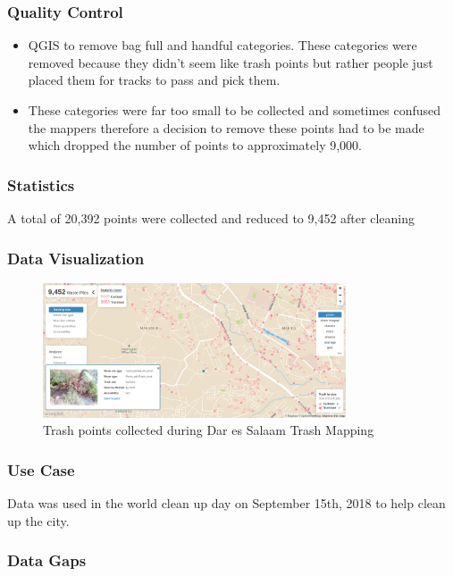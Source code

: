 \documentclass[a4paper,12pt,twoside]{article}
\begin{document}
\subsubsection{Quality Control}
\begin{itemize}
    \item QGIS to remove bag full and handful categories.
    These categories were removed because they didn't seem like trash points but rather people just placed them for tracks to pass and pick them.
    \item These categories were far too small to be collected and sometimes confused the mappers therefore a decision to remove these points had to be made which dropped the number of points to approximately 9,000.
\end{itemize}

\subsubsection{Statistics}
A total of 20,392 points were collected and reduced to 9,452 after cleaning

\subsubsection{Data Visualization}
\begin{figure}[h]
  \color{RHgreen}\caption{Trash points collected during Dar es Salaam Trash Mapping}
  \centering
  \includegraphics[width=0.8\textwidth]{images/dar_trash.png}
\end{figure}

\subsubsection{Use Case}
Data was used in the world clean up day on  September 15th, 2018 to help clean up the city.

\subsubsection{Data Gaps}
\end{document}
